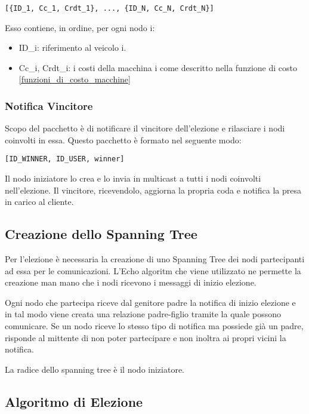 \begin{lstlisting} 
[{ID_1, Cc_1, Crdt_1}, ..., {ID_N, Cc_N, Crdt_N}]
\end{lstlisting}

Esso contiene, in ordine, per ogni nodo i: 
\begin{itemize}
	\item ID\_i: riferimento al veicolo i.
	\item Cc\_i, Crdt\_i: i costi della macchina i come descritto nella funzione di costo \ref{funzioni_di_costo_macchine}
\end{itemize}

\subsubsection{Notifica Vincitore}\label{pacchetto_vincitore}
Scopo del pacchetto è di notificare il vincitore dell'elezione e rilasciare i nodi coinvolti in essa. Questo pacchetto è formato nel seguente modo:

\begin{lstlisting}
[ID_WINNER, ID_USER, winner]
\end{lstlisting}

Il nodo iniziatore lo crea e lo invia in multicast a tutti i nodi coinvolti nell'elezione. Il vincitore, ricevendolo, aggiorna la propria coda e notifica la presa in carico al cliente.

\subsection{Creazione dello Spanning Tree}

Per l'elezione è necessaria la creazione di uno Spanning Tree dei nodi partecipanti ad essa per le comunicazioni. L'Echo algoritm che viene utilizzato ne permette la creazione man mano che i nodi ricevono i messaggi di inizio elezione.

Ogni nodo che partecipa riceve dal genitore padre la notifica di inizio elezione e in tal modo viene creata una relazione padre-figlio tramite la quale possono comunicare. Se un nodo riceve lo stesso tipo di notifica ma possiede già un padre, risponde al mittente di non poter partecipare e non inoltra ai propri vicini la notifica.

La radice dello spanning tree è il nodo iniziatore.

\subsection{Algoritmo di Elezione}

